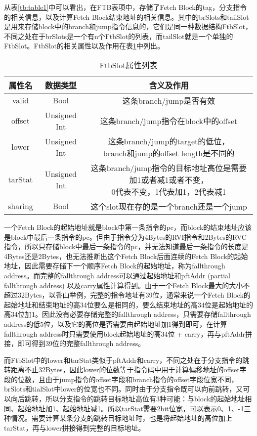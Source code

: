 从表\ref{tb:table1}中可以看出，在FTB表项中，存储了Fetch Block的tag，分支指令的相关信息，以及计算Fetch Block结束地址的相关信息。其中的brSlots和tailSlot是用来存储block中的branch和jump指令信息的，它们是同一种数据结构FtbSlot，不同之处在于brSlots是一个有n个FtbSlot的列表，而tailSlot就是一个单独的FtbSlot。FtbSlot的相关属性以及作用在表\ref{tb:table2}中列出。

\begin{table}[]
	\caption{FtbSlot属性列表}
	\label{tb:table2}
	\centering
	\begin{tabular}{|c|c|c|}
		\hline
		属性名   & 数据类型   & 含义及作用   \\ \hline
		valid & Bool & 这条branch/jump是否有效 \\ \hline
		offset & Unsigned Int & 这条branch/jump指令在block中的offset \\ \hline
		lower & Unsigned Int & \tabincell{c}{这条branch/jump的target的低位， \\ branch和jump的offset length是不同的} \\ \hline
		tarStat & Unsigned Int & \tabincell{c}{这条branch/jump指令的目标地址高位是需要加1或者减1或者不变， \\ 0代表不变，1代表加1，2代表减1} \\ \hline
		sharing & Bool & 这个slot现在存的是一个branch还是一个jump \\ \hline
	\end{tabular}
\end{table}

一个Fetch Block的起始地址就是block中第一条指令的pc，而block的结束地址应该是block中最后一条指令的pc。但由于指令分为4Bytes的RVI指令和2Bytes的RVC指令，所以只存储block中最后一条指令的pc，并无法知道最后一条指令的长度是4Bytes还是2Bytes，也无法推断出这个Fetch Block后面连续的Fetch Block的起始地址，因此需要存储下一个顺序Fetch Block的起始地址，称为fallthrough address。而完整的fallthrough address可以通过起始地址和pftAddr (partial fallthrough address) 以及carry属性计算得到。由于一个Fetch Block最大的大小不超过32Bytes，以香山举例，完整的指令地址有39位，通常来说一个Fetch Block的起始地址和结束地址的高34位要么是相同的，要么结束地址的高34位是起始地址的高34位加1。因此没有必要存储完整的fallthrough address，只需要存储fallthrough address的低5位，以及它的高位是否需要由起始地址加1得到即可，在计算fallthrough address时只需要使用block起始地址的高34位 + carry，再与pftAddr拼接，即可得到39位的完整fallthrough address。

而FtbSlot中的lower和tarStat类似于pftAddr和carry，不同之处在于分支指令的跳转距离不止32Bytes，因此lower的位数等于指令码中用于计算偏移地址的offset字段的位数，且由于jump指令的offset字段和branch指令的offset字段位宽不同，brSlots和tialSlot中lower的位宽也不同。同时由于分支指令既可以向前跳转，又可以向后跳转，所以分支指令的跳转目标地址高位有3种可能：与block的起始地址相同、起始地址加1、起始地址减1。所以tarStat需要2bit位宽，可以表示0、1、-1三种情况。需要计算某条分支的跳转目标地址时，也是将起始地址的高位加上tarStat，再与lower拼接得到完整的目标地址。

